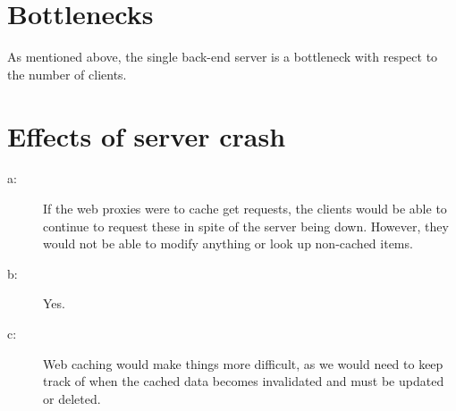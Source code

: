 \section{Bottlenecks}
As mentioned above, the single back-end server is a bottleneck with respect to the number of clients.

\section{Effects of server crash}
\begin{description}
\item[a:] If the web proxies were to cache get requests, the clients would be able to continue to request these in spite of the server being down. However, they would not be able to modify anything or look up non-cached items.
\item[b:] Yes.
\item[c:] Web caching would make things more difficult, as we would need to keep track of when the cached data becomes invalidated and must be updated or deleted.
\end{description}